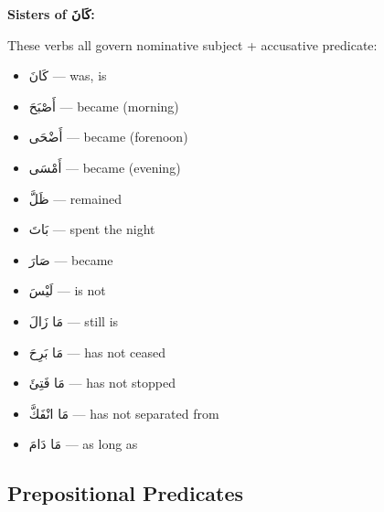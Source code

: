 \documentclass[letterpaper,12pt]{article}
\begin{document}
\begin{tcolorbox}[colback=boxcolor,colframe=headercolor,breakable]
\textbf{Sisters of \textarabic{كَانَ}:}

These verbs all govern nominative subject + accusative predicate:
\begin{itemize}
\item \textarabic{كَانَ} — was, is
\item \textarabic{أَصْبَحَ} — became (morning)
\item \textarabic{أَضْحَى} — became (forenoon)
\item \textarabic{أَمْسَى} — became (evening)
\item \textarabic{ظَلَّ} — remained
\item \textarabic{بَاتَ} — spent the night
\item \textarabic{صَارَ} — became
\item \textarabic{لَيْسَ} — is not
\item \textarabic{مَا زَالَ} — still is
\item \textarabic{مَا بَرِحَ} — has not ceased
\item \textarabic{مَا فَتِئَ} — has not stopped
\item \textarabic{مَا انْفَكَّ} — has not separated from
\item \textarabic{مَا دَامَ} — as long as
\end{itemize}
\end{tcolorbox}

\subsection{Prepositional Predicates}
\end{document}
